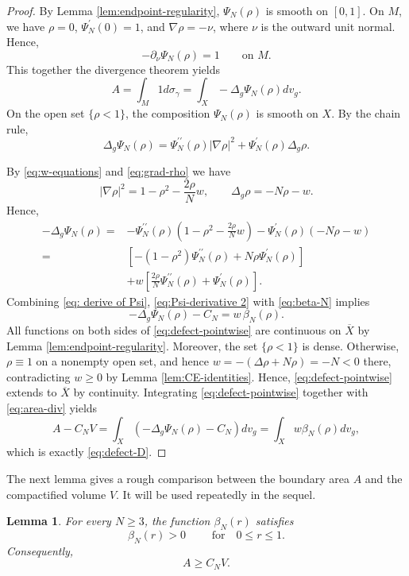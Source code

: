 \documentclass[11pt,letterpaper]{amsart}
\newtheorem{lemma}[theorem]{Lemma}
\theoremstyle{definition}
\theoremstyle{remark}
\numberwithin{equation}{section}
\newcommand{\barX}{\overline X}
\begin{document}
\begin{proof}
By Lemma \ref{lem:endpoint-regularity}, $\Psi_N(\rho)$ is smooth on $[0,1]$. On $M$, we have $\rho=0$, $\Psi_N^{\prime}(0)=1$, and $\nabla \rho=-\nu$, where $\nu$ is the outward unit normal. Hence,
\[
 -\partial_\nu \Psi_N(\rho)=1\qquad\text{on }M.
\]
This together the divergence theorem yields
\begin{equation}\label{eq:area-div}
 A=\int_M 1 d\sigma_\gamma=\int_X-\Delta_g \Psi_N(\rho) d v_g.
\end{equation}
On the open set $\{\rho<1\}$,
the composition $\Psi_N(\rho)$ is smooth on $X$. By the chain rule,
\begin{equation}
\Delta_g \Psi_N(\rho)=\Psi_N^{\prime \prime}(\rho)|\nabla \rho|^2+\Psi_N^{\prime}(\rho) \Delta_g \rho .
\end{equation}

By \eqref{eq:w-equations} and \eqref{eq:grad-rho} we have
\[|\nabla \rho|^2=1-\rho^2-\frac{2 \rho}{N} w, \qquad \Delta_g \rho=-N \rho-w .\]
Hence,
\begin{equation}\label{eq: derive of Psi}
\begin{aligned}
-\Delta_g \Psi_N(\rho)= & -\Psi_N^{\prime \prime}(\rho)\left(1-\rho^2-\frac{2 \rho}{N} w\right)-\Psi_N^{\prime}(\rho)(-N \rho-w) \\
= & {\left[-\left(1-\rho^2\right) \Psi_N^{\prime \prime}(\rho)+N \rho \Psi_N^{\prime}(\rho)\right] } \\
& +w\left[\frac{2 \rho}{N} \Psi_N^{\prime \prime}(\rho)+\Psi_N^{\prime}(\rho)\right].
\end{aligned} 
\end{equation}
Combining \eqref{eq: derive of Psi}, \eqref{eq:Psi-derivative 2} with  \eqref{eq:beta-N} implies
\begin{equation}\label{eq:defect-pointwise}
 -\Delta_g\Psi_N(\rho)-C_N=w\,\beta_N(\rho).
\end{equation}
All functions on both sides of \eqref{eq:defect-pointwise} are continuous on $\barX$ by Lemma \ref{lem:endpoint-regularity}.  Moreover, the set $\{\rho<1\}$ is dense. Otherwise,  $\rho \equiv 1$ on a nonempty open set, and hence $w=-(\Delta\rho+N\rho)=-N<0$ there, contradicting $w\ge0$ by Lemma \ref{lem:CE-identities}.  Hence, \eqref{eq:defect-pointwise}  extends to  $\barX$ by continuity. Integrating \eqref{eq:defect-pointwise} together with \eqref{eq:area-div} yields
\[A-C_N V=\int_X\left(-\Delta_g \Psi_N(\rho)-C_N\right) d v_g=\int_X w \beta_N(\rho) d v_g,\]
which is exactly \eqref{eq:defect-D}.
\end{proof}
The next lemma gives a rough comparison between the boundary area $A$ and the compactified volume $V$. It will be used repeatedly in the sequel.
\begin{lemma}\label{lem:beta-positive}
For every $N\ge3$, the function $\beta_N(r)$ satisfies
\[
 \beta_N(r)>0\qquad \text{ for}\quad  0\le r\le1.
\]
Consequently,
\begin{equation}\label{eq:reverse-bridge-general}
 A\ge C_NV.
\end{equation}
\end{lemma}
\end{document}
